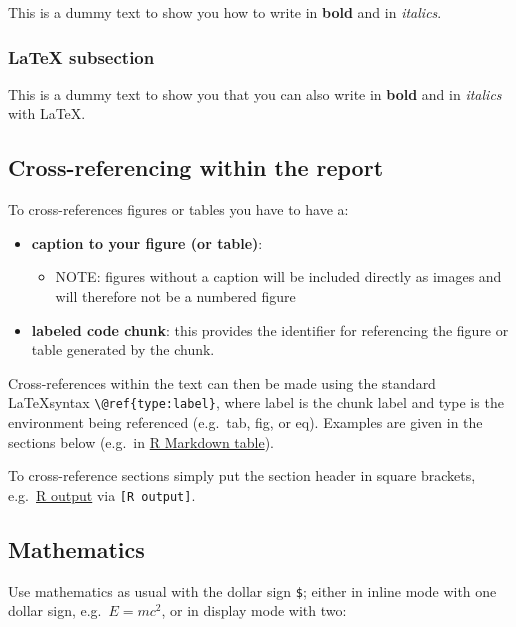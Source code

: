 \documentclass[
11pt,
a4paper]{article}
\providecommand{\tightlist}{%
  \setlength{\itemsep}{0pt}\setlength{\parskip}{0pt}}
\begin{document}
This is a dummy text to show you how to write in \textbf{bold} and in
\emph{italics}.

\subsubsection{LaTeX subsection}

This is a dummy text to show you that you can also write in
\textbf{bold} and in \textit{italics} with \LaTeX.

\hypertarget{cross-referencing-within-the-report}{%
\subsection{Cross-referencing within the
report}\label{cross-referencing-within-the-report}}

To cross-references figures or tables you have to have a:

\begin{itemize}
\tightlist
\item
  \textbf{caption to your figure (or table)}:

  \begin{itemize}
  \tightlist
  \item
    NOTE: figures without a caption will be included directly as images
    and will therefore not be a numbered figure
  \end{itemize}
\item
  \textbf{labeled code chunk}: this provides the identifier for
  referencing the figure or table generated by the chunk.
\end{itemize}

Cross-references within the text can then be made using the standard
\LaTeX syntax \texttt{\textbackslash{}@ref\{type:label\}}, where label
is the chunk label and type is the environment being referenced
(e.g.~tab, fig, or eq). Examples are given in the sections below
(e.g.~in \protect\hyperlink{r-markdown-table}{R Markdown table}).

To cross-reference sections simply put the section header in square
brackets, e.g.~\protect\hyperlink{r-output}{R output} via
\texttt{{[}R\ output{]}}.

\hypertarget{mathematics}{%
\subsection{Mathematics}\label{mathematics}}

Use mathematics as usual with the dollar sign \texttt{\$}; either in
inline mode with one dollar sign, e.g.~\(E = mc^2\), or in display mode
with two:
\end{document}
